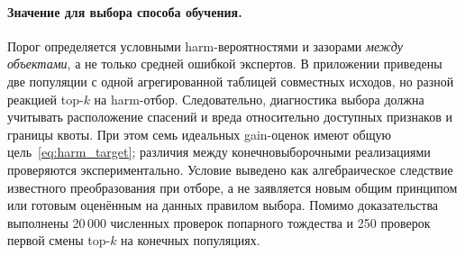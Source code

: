 \paragraph{Значение для выбора способа обучения.}
Порог определяется условными harm-вероятностями и зазорами
\emph{между объектами}, а не только средней ошибкой экспертов.
В приложении приведены две популяции с одной агрегированной таблицей
совместных исходов, но разной реакцией top-$k$ на harm-отбор.
Следовательно, диагностика выбора должна учитывать расположение
спасений и вреда относительно доступных признаков и границы квоты.
При этом семь идеальных gain-оценок имеют общую цель~\eqref{eq:harm_target};
различия между конечновыборочными реализациями проверяются экспериментально.
Условие выведено как алгебраическое следствие известного преобразования
при отборе, а не заявляется новым общим принципом или готовым
оценённым на данных правилом выбора. Помимо доказательства выполнены
20\,000 численных проверок попарного тождества и 250 проверок
первой смены top-$k$ на конечных популяциях.
